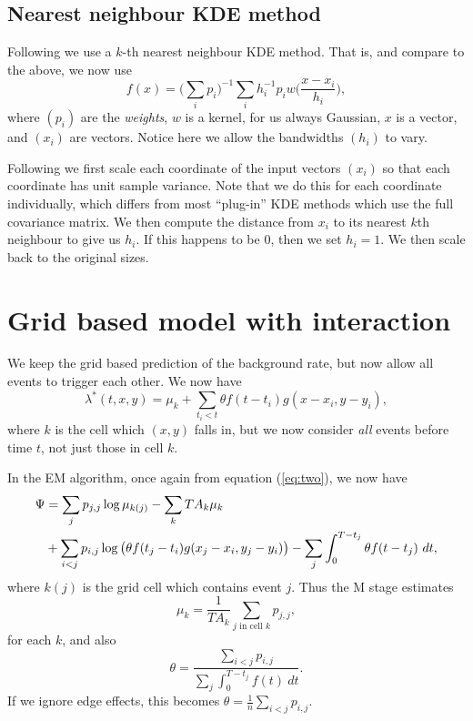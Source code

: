 \documentclass[twoside,a4paper]{article}
\theoremstyle{plain}
\theoremstyle{definition}
\begin{document}
\subsection{Nearest neighbour KDE method}\label{app:knn_details}

Following \cite{sepp} we use a $k$-th nearest neighbour KDE method.  That is, and compare
to the above, we now use
\[ f(x) = \Big( \sum_i p_i \Big)^{-1}
\sum_i h_i^{-1} p_i w\Big( \frac{x - x_i}{h_i} \Big), \]
where $(p_i)$ are the \emph{weights}, $w$ is a kernel, for us always Gaussian, $x$
is a vector, and $(x_i)$ are vectors.  Notice here we allow the bandwidths $(h_i)$ to
vary.

Following \cite{sepp} we first scale each coordinate of the input vectors $(x_i)$ so that
each coordinate has unit sample variance.  Note that we do this for each coordinate
individually, which differs from most ``plug-in'' KDE methods which use the full covariance
matrix.  We then compute the distance from $x_i$ to its nearest $k$th neighbour to give
us $h_i$.  If this happens to be $0$, then we set $h_i=1$.  We then scale back to the original
sizes.





\section{Grid based model with interaction}\label{app:grid_interact}

We keep the grid based prediction of the background rate, but now allow all events to
trigger each other.  We now have
\[ \lambda^*(t,x,y) = \mu_k + \sum_{t_i<t} \theta f(t-t_i) g(x-x_i, y-y_i), \]
where $k$ is the cell which $(x,y)$ falls in, but we now consider \emph{all} events before
time $t$, not just those in cell $k$.

In the EM algorithm, once again from equation (\ref{eq:two}), we now have
\begin{align}
\Psi &= \sum_j p_{j,j} \log \mu_{k(j)} - \sum_k T A_k \mu_k \notag \\
&+ \sum_{i<j} p_{i,j} \log\big(\theta f(t_j-t_i) g(x_j-x_i, y_j-y_i)\big)
- \sum_j \int_0^{T-t_j} \theta f(t-t_j) \ dt,
\label{eq:gen_one}
\end{align}
where $k(j)$ is the grid cell which contains event $j$.  Thus the M stage estimates
\[ \mu_k = \frac{1}{TA_k} \sum_{j\text{ in cell }k} p_{j,j}, \]
for each $k$, and also
\[ \theta = \frac{\sum_{i<j} p_{i,j}}{\sum_j \int_0^{T-t_j} f(t) \ dt}. \]
If we ignore edge effects, this becomes $\theta = \frac{1}{n} \sum_{i<j} p_{i,j}$.
\end{document}
